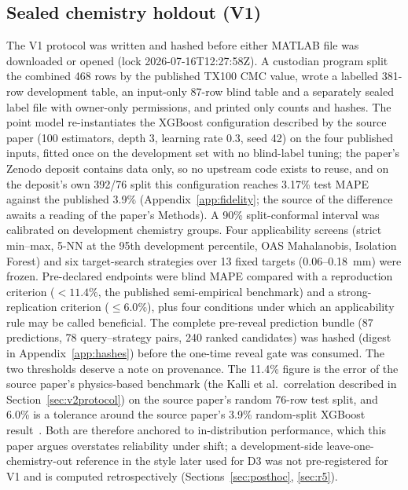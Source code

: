 \documentclass[11pt,a4paper]{article}
\newcommand{\tox}{TX100}
\begin{document}
\subsection{Sealed chemistry holdout (V1)}
\label{sec:v1protocol}
The V1 protocol was written and hashed before either MATLAB file was
downloaded or opened (lock 2026-07-16T12:27:58Z). A custodian program split
the combined 468 rows by the published \tox{} CMC value, wrote a labelled
381-row development table, an input-only 87-row blind table and a separately
sealed label file with owner-only permissions, and printed only counts and
hashes. The point
model re-instantiates the XGBoost configuration described by the source
paper (100 estimators, depth 3, learning rate 0.3, seed 42) on the four
published inputs, fitted once on the development set with no blind-label
tuning; the paper's Zenodo deposit contains data only, so no upstream code
exists to reuse, and on the deposit's own 392/76 split this configuration
reaches 3.17\% test MAPE against the published 3.9\%
(Appendix~\ref{app:fidelity}; the source of the difference awaits a reading
of the paper's Methods). A 90\% split-conformal interval was
calibrated on development chemistry groups. Four applicability screens
(strict min--max, 5-NN at the 95th development percentile, OAS Mahalanobis,
Isolation Forest) and six target-search strategies over 13 fixed targets
(0.06--0.18~mm) were frozen. Pre-declared endpoints were blind MAPE compared with a
reproduction criterion ($<11.4\%$, the published semi-empirical benchmark) and
a strong-replication criterion ($\le 6.0\%$), plus four conditions under which
an applicability rule may be called beneficial. The complete pre-reveal
prediction bundle (87 predictions, 78 query--strategy pairs, 240 ranked
candidates) was hashed (digest in Appendix~\ref{app:hashes}) before the one-time
reveal gate was consumed. The two thresholds deserve a note on provenance.
The 11.4\% figure is the error of the source paper's physics-based
benchmark (the Kalli et al.\ correlation described in
Section~\ref{sec:v2protocol}) on the source paper's random 76-row test
split, and 6.0\% is a tolerance around the source paper's 3.9\% random-split
XGBoost result~\cite{chagot2022}. Both are therefore anchored to
in-distribution performance, which this paper argues overstates reliability
under shift; a development-side leave-one-chemistry-out reference in the
style later used for D3 was not pre-registered for V1 and is computed
retrospectively (Sections~\ref{sec:posthoc}, \ref{sec:r5}).
\end{document}
